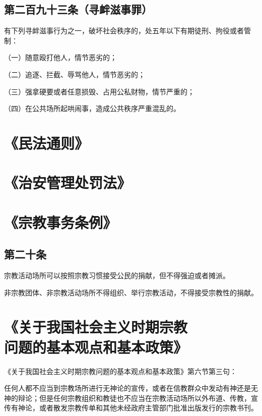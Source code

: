 \documentclass[utf-8,10pt]{ctexart}%
\begin{document}
\subsection{第二百九十三条（寻衅滋事罪）}
有下列寻衅滋事行为之一，破坏社会秩序的，处五年以下有期徒刑、拘役或者管制：

（一）随意殴打他人，情节恶劣的；

（二）追逐、拦截、辱骂他人，情节恶劣的；

（三）强拿硬要或者任意损毁、占用公私财物，情节严重的；

（四）在公共场所起哄闹事，造成公共秩序严重混乱的。
\section{《民法通则》}
\section{《治安管理处罚法》}
\section{《宗教事务条例》}
\subsection{第二十条}
宗教活动场所可以按照宗教习惯接受公民的捐献，但不得强迫或者摊派。

非宗教团体、非宗教活动场所不得组织、举行宗教活动，不得接受宗教性的捐献。
\section{《关于我国社会主义时期宗教\\问题的基本观点和基本政策》}
\noindent 《关于我国社会主义时期宗教问题的基本观点和基本政策》第六节第三句：

任何人都不应当到宗教场所进行无神论的宣传，或者在信教群众中发动有神还是无神的辩论；但是任何宗教组织和教徒也不应当在宗教活动场所以外布道、传教，宣传有神论，或者散发宗教传单和其他未经政府主管部门批准出版发行的宗教书刊。
\end{document}
